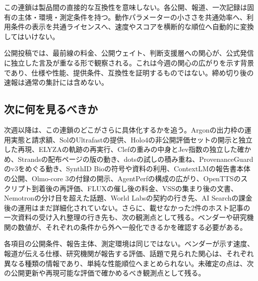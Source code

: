 この連鎖は製品間の直接的な互換性を意味しない。各公開、報道、一次記録は固有の主体・環境・測定条件を持つ。動作パラメーターの小ささを共通効率へ、利用条件の表示を共通ライセンスへ、速度やスコアを横断的な順位へ自動的に変換してはいけない。

\begin{communitynote}
公開投稿では、最前線の料金、公開ウェイト、判断支援層への関心が、公式発信に独立した言及が重なる形で観察される。これは今週の関心の広がりを示す背景であり、仕様や性能、提供条件、互換性を証明するものではない。締め切り後の速報は通常の集計には含めない。
\end{communitynote}

\subsection*{次に何を見るべきか}
次週以降は、この連鎖のどこがさらに具体化するかを追う。Argonの出力枠の運用実態と請求額、SolのUltrafastの提供、Holo4の非公開評価セットの開示と独立した再現、ELYZAの軌跡の再実行、Clefの重みの中身とJev指数の独立した確かめ、Strandsの配布ページの版の動き、dotsの試しの積み重ね、ProvenanceGuardのv3をめぐる動き、SynthID Bioの符号や資料の利用、ContextLMの報告書本体の公開、Olmo-core 3の付録の開示、AgentPerfの構成の広がり、OpenTTSのスクリプト到着後の再評価、FLUXの催し後の料金、VSSの集まり後の文書、Nemotronの分け目を超えた話題、World Labsの契約の行き先、AI Searchの課金後の運用はまだ詳細化されていない。さらに、載せなかった2件のホスト記事の一次資料の受け入れ整理の行き先も、次の観測点として残る。ベンダーや研究機関の数値が、それぞれの条件から外へ一般化できるかを確認する必要がある。

\begin{claimboundary}[この総括の読み方]
各項目の公開条件、報告主体、測定環境は同じではない。ベンダーが示す速度、報道が伝える仕様、研究機関が報告する評価、話題で見られた関心は、それぞれ異なる種類の情報であり、単純な性能順位へまとめられない。未確定の点は、次の公開更新や再現可能な評価で確かめるべき観測点として残る。
\end{claimboundary}
